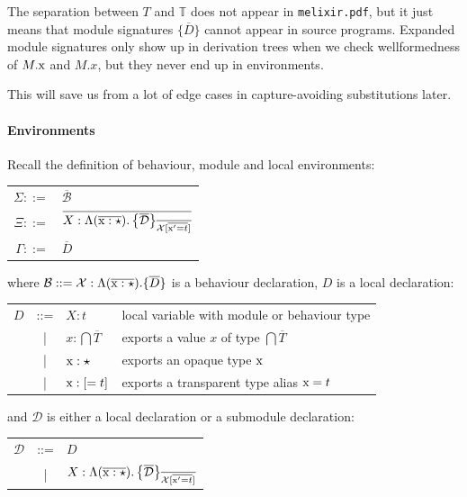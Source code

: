 \documentclass[12pt]{article}
\newcommand{\tx}{\text{\rm x}}
\newcommand{\BX}{\ensuremath{\mathcal{X}}}
\newcommand{\Gammatop}{\ensuremath{\Xi}}
\newcommand{\Gammabot}{\ensuremath{\Gamma}}
\begin{document}
The separation between $T$ and $\mathbb{T}$ does not appear in \texttt{melixir.pdf}, but it
just means that module signatures $\{ \overline{D} \}$ cannot appear in source programs.
Expanded module signatures only show up in derivation trees when we check wellformedness of $M.\tx$ and $M.x$,
but they never end up in environments.

This will save us from a lot of edge cases in capture-avoiding substitutions later.

\paragraph{Environments}

Recall the definition of behaviour, module and local environments:

\begin{center}
    \begin{tabular}{rl}
        $\Sigma ::=$    & $\overline{\mathcal B}$   \\[3mm]
        $\Gammatop ::=$ & $\overline{X : \Moddecl}$ \\[3mm]
        $\Gammabot ::=$ & $\overline{D}$
    \end{tabular}
\end{center}

where $\mathcal{B} ::= \BX : \Lambda (\overline{\tx : \star}) . \{ \overline{D} \}$
is a behaviour declaration, $D$ is a local declaration:

\begin{center}
    \begin{tabular}{rcll}
        $D$ & ::= & $ X : t$                   & \color{Gray} local variable with module or behaviour type     \\
            & |   & $x : \bigcap \overline{T}$ & \color{Gray} exports a value $x$ of type $\bigcap\overline T$ \\
            & |   & $\tx : \star$              & \color{Gray} exports an opaque type $\tx$                     \\
            & |   & $\tx : [=t]$               & \color{Gray} exports a transparent type alias $\tx = t$
    \end{tabular}
\end{center}

and $\mathcal{D}$ is either a local declaration or a submodule declaration:

\begin{center}
    \begin{tabular}{rcl}
        $\mathcal{D}$ & ::= & $D$            \\
                      & |   & $X : \Moddecl$
    \end{tabular}
\end{center}
\end{document}

